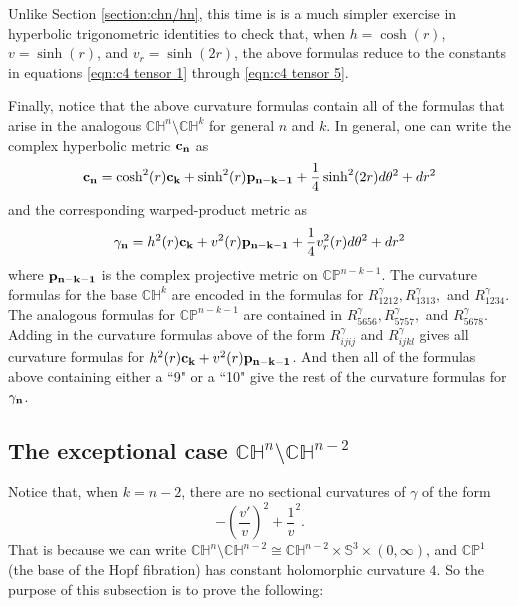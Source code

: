 \documentclass[10pt]{amsart}
\def\S{\mathcal{S}}
\def\g{\gamma}
\def\th{\theta}
\def\H{\mathbb{H}}
\def\C{\mathbb{C}}
\def\S{\mathbb{S}}
\def\P{\mathbb{P}}
\theoremstyle{definition}
\theoremstyle{remark}
\numberwithin{equation}{section}
\begin{document}
\vskip 10pt
	
Unlike Section \ref{section:chn/hn}, this time is is a much simpler exercise in hyperbolic trigonometric identities to check that, when $h = \cosh(r)$, $v = \sinh(r)$, and $v_r = \sinh(2r)$, the above formulas reduce to the constants in equations \eqref{eqn:c4 tensor 1} through \eqref{eqn:c4 tensor 5}. 

Finally, notice that the above curvature formulas contain all of the formulas that arise in the analogous $\C \H^n \setminus \C \H^k$ for general $n$ and $k$.  
In general, one can write the complex hyperbolic metric ${\bf c_n}$ as
	\begin{equation*}
	{\bf c_n} = \cosh^2(r) {\bf c_k} + \sinh^2(r) {\bf p_{n-k-1}} + \frac{1}{4} \sinh^2(2r) d \th^2 + dr^2
	\end{equation*}
and the corresponding warped-product metric as
	\begin{equation*}
	{\bf \g_n} = h^2(r) {\bf c_k} + v^2(r) {\bf p_{n-k-1}} + \frac{1}{4} v_r^2(r) d \th^2 + dr^2
	\end{equation*}
where ${\bf p_{n-k-1}}$ is the complex projective metric on $\C \P^{n-k-1}$.  
The curvature formulas for the base $\C \H^k$ are encoded in the formulas for $R^{\g}_{1212}, R^{\g}_{1313}, $ and $R^{\g}_{1234}$.  
The analogous formulas for $\C \P^{n-k-1}$ are contained in $R^{\g}_{5656}, R^{\g}_{5757}, $ and $R^{\g}_{5678}$.
Adding in the curvature formulas above of the form $R^{\g}_{ijij}$ and $R^{\g}_{ijkl}$ gives all curvature formulas for $h^2(r) {\bf c_k} + v^2(r) {\bf p_{n-k-1}}$.  
And then all of the formulas above containing either a ``9" or a ``10" give the rest of the curvature formulas for ${\bf \g_n }$.



\subsection{The exceptional case $\C \H^n \setminus \C \H^{n-2}$}\label{subsection:chn/chn-2}
Notice that, when $k = n-2$, there are no sectional curvatures of $\g$ of the form
	\begin{equation*}
	- \left( \frac{v'}{v} \right)^2 + \frac{1}{v}^2.
	\end{equation*}
That is because we can write $\C \H^n \setminus \C \H^{n-2} \cong \C \H^{n-2} \times \S^3 \times (0,\infty)$, and $\C \P^1 $ (the base of the Hopf fibration) has constant holomorphic curvature $4$.
So the purpose of this subsection is to prove the following:
\end{document}
